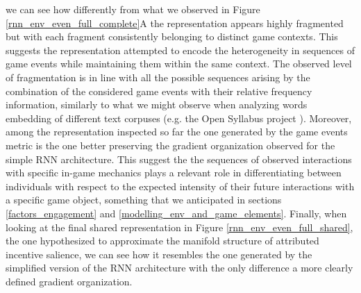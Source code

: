 we can see how differently from what we observed in Figure \ref{rnn_env_even_full_complete}A the representation appears highly fragmented but with each fragment consistently belonging to distinct game contexts. This suggests the representation attempted to encode the heterogeneity in sequences of game events while maintaining them within the same context. The observed level of fragmentation is in line with all the possible sequences arising by the combination of the considered game events with their relative frequency information, similarly to what we might observe when analyzing words embedding of different text corpuses (e.g. the Open Syllabus project \cite{opensyllabus}). Moreover, among the representation inspected so far the one generated by the game events metric is the one better preserving the gradient organization observed for the simple RNN architecture. This suggest the the sequences of observed interactions with specific in-game mechanics plays a relevant role in differentiating between individuals with respect to the expected intensity of their future interactions with a specific game object, something that we anticipated in sections \ref{factors_engagement} and \ref{modelling_env_and_game_elements}. Finally, when looking at the final shared representation in Figure \ref{rnn_env_even_full_shared}, the one hypothesized to approximate the manifold structure of attributed incentive salience, we can see how it resembles the one generated by the simplified version of the RNN architecture with the only difference a more clearly defined gradient organization.


